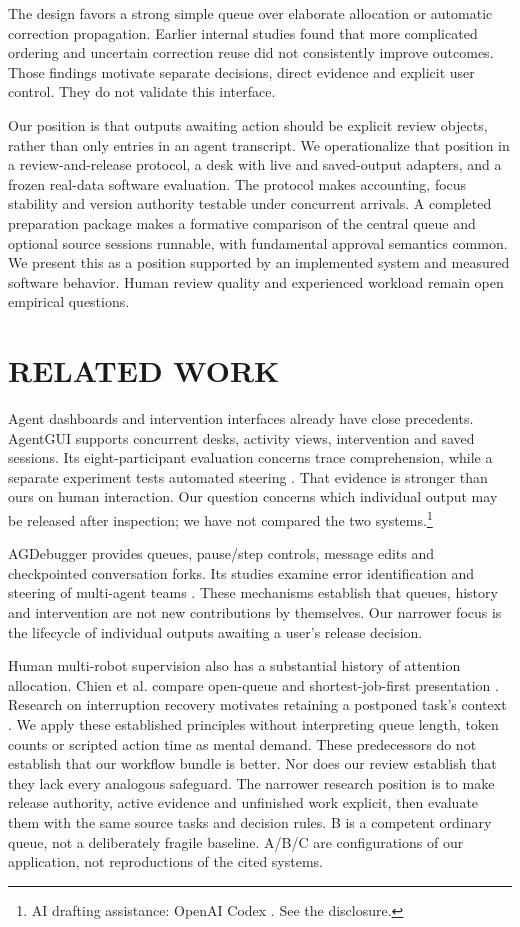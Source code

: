\documentclass[a4paper,twoside]{article}
\newcommand{\credit}{\footnote{AI drafting assistance: OpenAI Codex \cite{codex}. See the disclosure.}}
\begin{document}
The design favors a strong simple queue over elaborate allocation or automatic
correction propagation. Earlier internal studies found that more complicated
ordering and uncertain correction reuse did not consistently improve outcomes.
Those findings motivate separate decisions, direct evidence and explicit user
control. They do not validate this interface.

Our position is that outputs awaiting action should be explicit review objects,
rather than only entries in an agent transcript. We operationalize that position
in a review-and-release protocol, a desk with live and saved-output adapters, and
a frozen real-data software evaluation. The
protocol makes accounting, focus stability and version authority testable under
concurrent arrivals. A completed preparation package makes a formative comparison of the central queue
and optional source sessions runnable, with fundamental approval semantics common.
We present this as a position supported by an implemented system and measured
software behavior. Human review quality and experienced workload remain open
empirical questions.

\section{RELATED WORK}
Agent dashboards and intervention interfaces already have close precedents.
AgentGUI supports concurrent desks, activity views, intervention and saved
sessions. Its eight-participant evaluation concerns trace comprehension, while
a separate experiment tests automated steering \cite{agentgui}. That evidence
is stronger than ours on human interaction. Our question concerns which individual
output may be released after inspection; we have not compared the two systems.\credit

AGDebugger provides queues, pause/step controls, message edits and checkpointed
conversation forks. Its studies examine error identification and steering of
multi-agent teams \cite{agdebugger}. These mechanisms establish that queues,
history and intervention are not new contributions by themselves. Our narrower
focus is the lifecycle of individual outputs awaiting a user's release decision.

Human multi-robot supervision also has a substantial history of attention
allocation. Chien et al. compare open-queue and shortest-job-first presentation
\cite{chien}. Research on interruption recovery motivates retaining a postponed
task's context \cite{iqbal}. We apply these established principles without
interpreting queue length, token counts or scripted action time as mental demand.
These predecessors do not establish that our workflow bundle is better. Nor does
our review establish that they lack every analogous safeguard. The narrower
research position is to make release authority, active evidence and unfinished
work explicit, then evaluate them with the same source tasks and decision rules.
B is a competent ordinary queue, not a deliberately fragile baseline. A/B/C are
configurations of our application, not reproductions of the cited systems.
\end{document}

